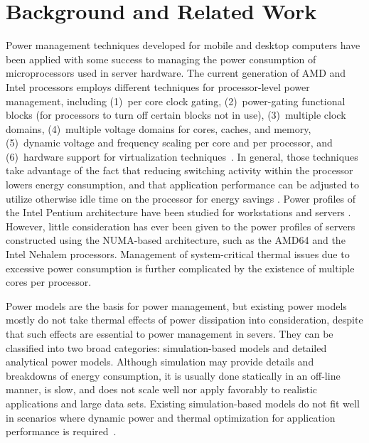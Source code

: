 %
%
\chapter{Background and Related Work}
\label{chp:priorwork}
Power management techniques developed for mobile and desktop computers
have been applied with some success to managing the power consumption of
microprocessors used in server hardware.  The current generation of AMD
and Intel processors employs different techniques for processor-level
power management, including (1)~per core clock gating, (2)~power-gating
functional blocks (for processors to turn off certain blocks not in
use), (3)~multiple clock domains, (4)~multiple voltage domains for
cores, caches, and memory, (5)~dynamic voltage and frequency scaling per
core and per processor, and (6)~hardware support for virtualization
techniques~\cite{AMD2008b,Intel2009}. In general, those
techniques take advantage of the fact that reducing switching activity
within the processor lowers energy consumption, and that application
performance can be adjusted to utilize otherwise idle time on the
processor for energy savings \cite{Contreras2005}.  Power profiles of
the Intel Pentium architecture have been studied for workstations
\cite{Isci2003a,Isci2003b,Isci2006} and servers
\cite{Bircher2004,Bircher2007,Lee2005}.  However, little
consideration has ever been given to the power profiles of servers
constructed using the {NUMA}-based architecture, such as the AMD64
\cite{AMD2007} and the Intel Nehalem \cite{Intel2009}
processors. Management of system-critical thermal issues due to
excessive power consumption is further complicated by the existence of
multiple cores per processor.

Power models are the basis for power management, but existing power
models mostly do not take thermal effects of power dissipation into
consideration, despite that such effects are essential to power
management in severs.  They can be classified into two broad categories:
simulation-based models and detailed analytical power models. Although
simulation may provide details and breakdowns of energy consumption, it
is usually done statically in an off-line manner, is slow, and does not
scale well nor apply favorably to realistic applications and large data
sets.  Existing simulation-based models do not fit well in scenarios
where dynamic power and thermal optimization for application performance
is required~\cite{Economou2006}.
 

